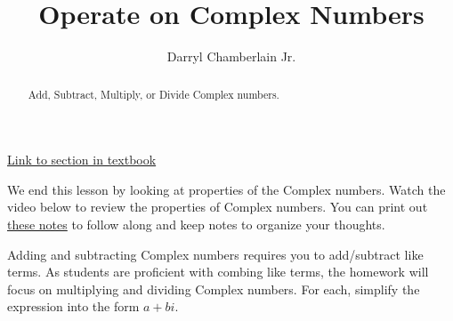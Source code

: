 \documentclass{ximera}
\author{Darryl Chamberlain Jr.}
\title{Operate on Complex Numbers}
\begin{document}
\begin{abstract}
Add, Subtract, Multiply, or Divide Complex numbers.
\end{abstract}
\maketitle

\href{https://cnx.org/contents/mwjClAV_@8.1:Sqk1HAGf@9/Complex-Numbers}{Link to section in textbook}


We end this lesson by looking at properties of the Complex numbers. Watch the video below to review the properties of Complex numbers. You can print out \href{http://people.clas.ufl.edu/dchamberlain31/files/Objective-4-Operate-on-Complex-Numbers.pdf}{these notes} to follow along and keep notes to organize your thoughts.


Adding and subtracting Complex numbers requires you to add/subtract like terms. As students are proficient with combing like terms, the homework will focus on multiplying and dividing Complex numbers. For each, simplify the expression into the form $a+bi$.
\end{document}
